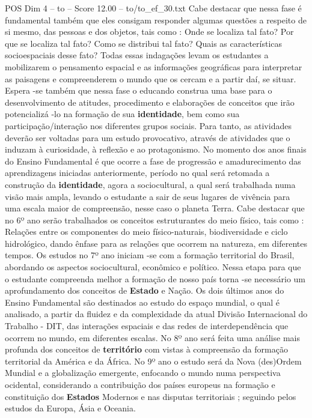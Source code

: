 \begin{textsample}{POS Dim 4 – to – Score 12.00 – to/to\_ef\_30.txt}
Cabe destacar que nessa fase é fundamental também que eles consigam responder algumas questões a respeito de si mesmo, das pessoas e dos objetos, tais como : Onde se localiza tal fato?
Por que se localiza tal fato?
Como se distribui tal fato?
Quais as características socioespaciais desse fato?
Todas essas indagações levam os estudantes a mobilizarem o pensamento espacial e as informações geográficas para interpretar as paisagens e compreenderem o mundo que os cercam e a partir daí, se situar.
Espera -se também que nessa fase o educando construa uma base para o desenvolvimento de atitudes, procedimento e elaborações de conceitos que irão potencializá -lo na formação de sua \textbf{identidade}, bem como sua participação/interação nos diferentes grupos sociais.
Para tanto, as atividades deverão ser voltadas para um estudo provocativo, através de atividades que o induzam à curiosidade, à reflexão e ao protagonismo.
No momento dos anos finais do Ensino Fundamental é que ocorre a fase de progressão e amadurecimento das aprendizagens iniciadas anteriormente, período no qual será retomada a construção da \textbf{identidade}, agora a sociocultural, a qual será trabalhada numa visão mais ampla, levando o estudante a sair de seus lugares de vivência para uma escala maior de compreensão, nesse caso o planeta Terra.
Cabe destacar que no 6º ano serão trabalhados os conceitos estruturantes do meio físico, tais como : Relações entre os componentes do meio físico-naturais, biodiversidade e ciclo hidrológico, dando ênfase para as relações que ocorrem na natureza, em diferentes tempos.
Os estudos no 7º ano iniciam -se com a formação territorial do Brasil, abordando os aspectos sociocultural, econômico e político.
Nessa etapa para que o estudante compreenda melhor a formação de nosso país torna -se necessário um aprofundamento dos conceitos de \textbf{Estado} e Nação.
Os dois últimos anos do Ensino Fundamental são destinados ao estudo do espaço mundial, o qual é analisado, a partir da fluidez e da complexidade da atual Divisão Internacional do Trabalho - DIT, das interações espaciais e das redes de interdependência que ocorrem no mundo, em diferentes escalas.
No 8º ano será feita uma análise mais profunda dos conceitos de \textbf{território} com vistas à compreensão da formação territorial da América e da África.
No 9º ano o estudo será da Nova (des)Ordem Mundial e a globalização emergente, enfocando o mundo numa perspectiva ocidental, considerando a contribuição dos países europeus na formação e constituição dos \textbf{Estados} Modernos e nas disputas territoriais ; seguindo pelos estudos da Europa, Ásia e Oceania.

\end{textsample}
